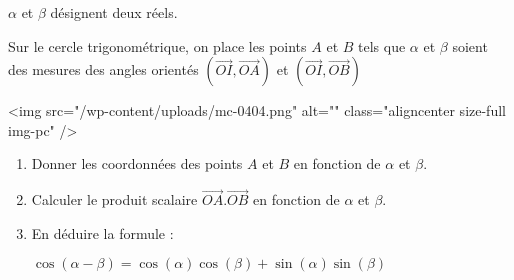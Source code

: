 
%
$\alpha $ et $\beta $ désignent deux réels.
\par
Sur le cercle trigonométrique, on place les points  $A$ et $B$ tels que $\alpha $ et $\beta $ soient des mesures des angles orientés $\left(\overrightarrow{OI}, \overrightarrow{OA}\right)$ et $\left(\overrightarrow{OI}, \overrightarrow{OB}\right)$

\begin{center}
\end{center}
<img src="/wp-content/uploads/mc-0404.png" alt="" class="aligncenter size-full  img-pc" />
\begin{enumerate}
     \item
     Donner les coordonnées des points $A$ et $B$ en fonction de $\alpha $ et $\beta $.
     \item
     Calculer le produit scalaire $\overrightarrow{OA}.\overrightarrow{OB}$ en fonction de $\alpha $ et $\beta $.
     \item
     En déduire la formule :
     \begin{center}$\cos\left(\alpha -\beta \right)=\cos\left(\alpha \right)\cos\left(\beta \right)+\sin\left(\alpha \right)\sin\left(\beta \right)$\end{center}
\end{enumerate}

